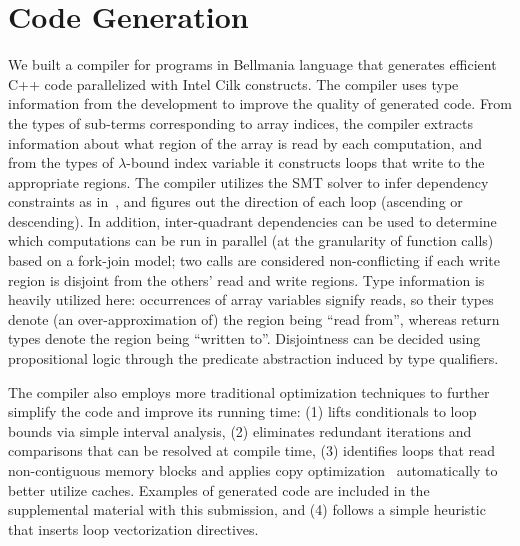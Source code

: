 \section{Code Generation}
\label{codegen}

We built a compiler for programs in Bellmania language that generates efficient C++ code parallelized with Intel Cilk constructs. The compiler uses type information from the development to improve the
quality of generated code. From the types of sub-terms corresponding
to array indices, the compiler extracts information about what region
of the array is read by each computation, and from the types of $\lambda$-bound index variable it constructs loops that write to
the appropriate regions. The compiler utilizes the SMT solver to infer dependency constraints as in~\cite{JACM67/Karp},
and figures out the direction of each loop (ascending or descending). 
In addition, inter-quadrant dependencies can be used to determine which computations can be run in parallel (at the granularity of
function calls) based on a fork-join model;
two calls are considered non-conflicting if each write region is disjoint from the others' read and write regions.
Type information is heavily utilized here: occurrences of array variables signify reads,
so their types denote (an over-approximation of) the region being ``read from'',
whereas return types denote the region being ``written to''.
Disjointness can be decided using propositional logic through the predicate abstraction induced by type qualifiers.

The compiler also employs more traditional optimization techniques
to further simplify the code and improve its running time:
(1) lifts conditionals to loop bounds via simple interval analysis, %
(2) eliminates redundant iterations and comparisons that can be resolved at compile time,
(3) identifies loops that read non-contiguous memory blocks and applies copy optimization~\cite{ASPLOS91/Lam} automatically to better utilize caches. Examples of generated code are included in the supplemental material with this submission,
and 
(4) follows a simple heuristic that inserts loop vectorization directives.

 

